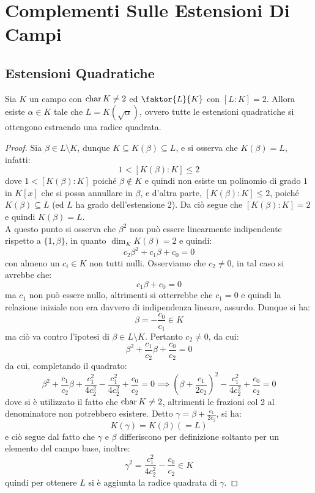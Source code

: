 \documentclass[11pt]{scrartcl}
\begin{document}
\newpage
\section{Complementi Sulle Estensioni Di Campi}
\subsection{Estensioni Quadratiche}

\begin{theorem}
Sia $K$ un campo con $\text{char}\, K \ne 2$ ed $\faktor{L}{K}$ con $[L:K] = 2$.
Allora esiste $\alpha \in K$ tale che $L = K(\sqrt{\alpha})$, ovvero tutte le 
estensioni quadratiche si ottengono estraendo una radice quadrata.
\end{theorem}

\begin{proof}
Sia $\beta \in L\setminus{K}$, dunque $K \subseteq K(\beta) \subseteq L$, e si osserva che $K(\beta) = L$, infatti:
	\[ 1<[K(\beta) : K] \leq 2
		\]
dove $1<[K(\beta) : K]$ poiché $\beta \not\in K$ e quindi non esiste un polinomio di grado $1$ in $K[x]$ che si possa annullare in $\beta$, e d'altra parte, $[K(\beta) : K] \leq 2$,
 poiché $K(\beta) \subseteq L$ (ed $L$ ha grado dell'estensione $2$). Da ciò segue che $[K(\beta) : K] = 2$ e quindi $K(\beta) = L$. \\
A questo punto si osserva che $\beta^2$ non può essere linearmente indipendente rispetto a $\{1,\beta\}$, in quanto $\dim_K K(\beta) = 2$ e quindi:
	\[ c_2 \beta^2+c_1\beta+c_0 = 0
		\]
con almeno un $c_i \in K$ non tutti nulli. Osserviamo che $c_2 \ne 0$, in tal caso si avrebbe che:
	\[ c_1\beta + c_0 = 0
	\]
ma $c_1$ non può essere nullo, altrimenti si otterrebbe che $c_1 = 0$ e quindi la relazione iniziale non era davvero di indipendenza lineare, assurdo. Dunque si ha:
	\[ \beta = - \frac {c_0}{c_1} \in K
	\]
ma ciò va contro l'ipotesi di $\beta \in L\setminus{K}$. Pertanto $c_2 \ne 0$, da cui:
	\[  \beta^2+ \frac{c_1}{c_2}\beta+\frac{c_0}{c_2} = 0
	\]
da cui, completando il quadrato:
	\[ \beta^2+ \frac{c_1}{c_2}\beta+ \frac{c_1^2}{4c_2^2} -  \frac{c_1^2}{4c_2^2} + \frac{c_0}{c_2} = 0 
	\implies \left(\beta + \frac{c_1}{2c_2}\right)^2 -  \frac{c_1^2}{4c_2^2} + \frac{c_0}{c_2} = 0
	\]
dove si è utilizzato il fatto che $\text{char}\, K \ne 2$, altrimenti le frazioni col 2 al denominatore non potrebbero esistere. Detto $\gamma = \beta + \frac{c_1}{2c_2}$, si ha:
	\[ K(\gamma) = K(\beta) (= L)
	\]
e ciò segue dal fatto che $\gamma$ e $\beta$ differiscono per definizione soltanto per un elemento del campo base, inoltre:
	\[ \gamma^2 =  \frac{c_1^2}{4c_2^2} - \frac{c_0}{c_2} \in K
	\]
quindi per ottenere $L$ si è aggiunta la radice quadrata di $\gamma$.
\end{proof}
\end{document}
